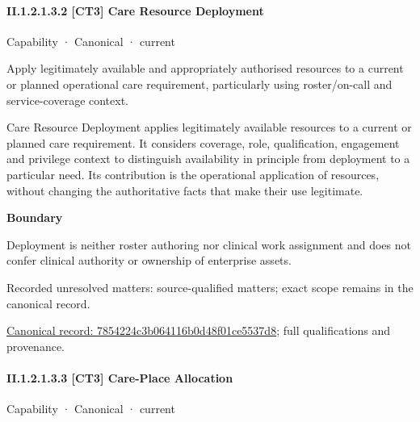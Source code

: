 \paragraph*{II.1.2.1.3.2 [CT3] Care Resource Deployment}
\label{navigation:II.1.2.1.3.2}

\label{element:7854224c3b064116b0d48f01ce5537d8}
{\small Capability · Canonical · current}\par

Apply legitimately available and appropriately authorised resources to a current or planned operational care requirement, particularly using roster/on-call and service-coverage context.



Care Resource Deployment applies legitimately available resources to a current or planned care requirement. It considers coverage, role, qualification, engagement and privilege context to distinguish availability in principle from deployment to a particular need. Its contribution is the operational application of resources, without changing the authoritative facts that make their use legitimate.



\textbf{Boundary}



Deployment is neither roster authoring nor clinical work assignment and does not confer clinical authority or ownership of enterprise assets.


{\small Recorded unresolved matters: source-qualified matters; exact scope remains in the canonical record.}\par
{\footnotesize \href{../../../../../../../continuum/strategy/capability/7854224c3b064116b0d48f01ce5537d8.md}{Canonical record: 7854224c3b064116b0d48f01ce5537d8}; full qualifications and provenance.}\par
\paragraph*{II.1.2.1.3.3 [CT3] Care-Place Allocation}
\label{navigation:II.1.2.1.3.3}

\label{element:f8a4df47bea742a0869802472136d55f}
{\small Capability · Canonical · current}\par

